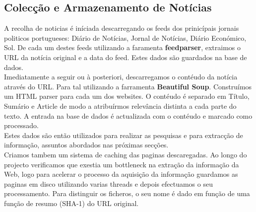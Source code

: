 \subsection{Colecção e Armazenamento de Notícias}
\label{sec:news_storage}
\hspace{15pt}A recolha de noticias é iníciada descarregando os feeds dos prinicípais jornais politicos portugueses: Diário de Notícias, Jornal de Notícias, Diário Económico, Sol. De cada um destes feeds utilizando a faramenta \textbf{feedparser}, extraimos o URL da notícia original e a data do feed. Estes dados são guardados na base de dados.\\
Imediatamente a seguir ou à posteriori, descarregamos o contéudo da notícia através do URL. Para tal utilizando a farramenta \textbf{Beautiful Soup}. Construímos um HTML parser para cada um dos websites. O contéudo é separado em Título, Sumário e Article de modo a atribuírmos relevância distinta a cada parte do texto. A entrada na base de dados é actualizada com o contéudo e marcado como processado.\\
Estes dados são então utilizados para realizar as pesquisas e para extracção de informação, assuntos abordados nas próximas secções.\\
Criamos tambem um sistema de caching das paginas descaregadas. Ao longo do projecto verificamos que exestia um bottleneck na extração da informação da Web, logo para acelerar o processo da aquisição da informação guardamos as paginas em disco utilizando varias threads e depois efectuamos o seu processamento. Para distinguir os ficheros, o seu nome é dado em função de uma função de resumo (SHA-1) do URL original.